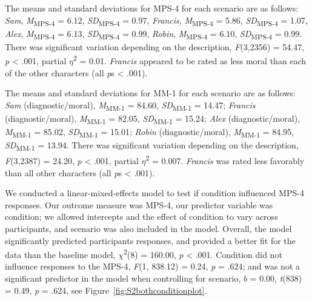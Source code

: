 \documentclass[
  man,floatsintext]{apa7}
\begin{document}
The means and standard deviations for MPS-4 for each scenario are as follows:
\emph{Sam},
\emph{M}\textsubscript{MPS-4} = 6.12, \emph{SD}\textsubscript{MPS-4} = 0.97,
\emph{Francis},
\emph{M}\textsubscript{MPS-4} = 5.86, \emph{SD}\textsubscript{MPS-4} = 1.07,
\emph{Alex},
\emph{M}\textsubscript{MPS-4} = 6.13, \emph{SD}\textsubscript{MPS-4} = 0.99,
\emph{Robin},
\emph{M}\textsubscript{MPS-4} = 6.10, \emph{SD}\textsubscript{MPS-4} = 0.99. There was significant variation depending on the description, \emph{F}(3,2356) = 54.47, \emph{p} \textless{} .001, partial \(\eta\)\textsuperscript{2} = 0.01. \emph{Francis} appeared to be rated as less moral than each of the other characters (all \emph{p}s \textless{} .001).

The means and standard deviations for MM-1 for each scenario are as follows:
\emph{Sam} (diagnostic/moral),
\emph{M}\textsubscript{MM-1} = 84.60, \emph{SD}\textsubscript{MM-1} = 14.47;
\emph{Francis} (diagnostic/moral),
\emph{M}\textsubscript{MM-1} = 82.05, \emph{SD}\textsubscript{MM-1} = 15.24;
\emph{Alex} (diagnostic/moral),
\emph{M}\textsubscript{MM-1} = 85.02, \emph{SD}\textsubscript{MM-1} = 15.01;
\emph{Robin} (diagnostic/moral),
\emph{M}\textsubscript{MM-1} = 84.95, \emph{SD}\textsubscript{MM-1} = 13.94. There was significant variation depending on the description, \emph{F}(3,2387) = 24.20, \emph{p} \textless{} .001, partial \(\eta\)\textsuperscript{2} = 0.007. \emph{Francis} was rated less favorably than all other characters (all \emph{p}s \textless{} .001).

We conducted a linear-mixed-effects model to test if condition influenced MPS-4 responses. Our outcome measure was MPS-4, our predictor variable was condition; we allowed intercepts and the effect of condition to vary across participants, and scenario was also included in the model.
Overall, the model significantly predicted participants responses, and provided a better fit for the data than the baseline model, \(\chi\)\textsuperscript{2}(8) = 160.00, \emph{p} \textless{} .001. Condition did not influence responses to the MPS-4, \emph{F}(1, 838.12) = 0.24, \emph{p} = .624; and was not a significant predictor in the model when controlling for scenario, \(b\) = 0.00, \emph{t}(838) = 0.49, \emph{p} = .624, see Figure~\ref{fig:S2bothconditionplot}.
\end{document}
